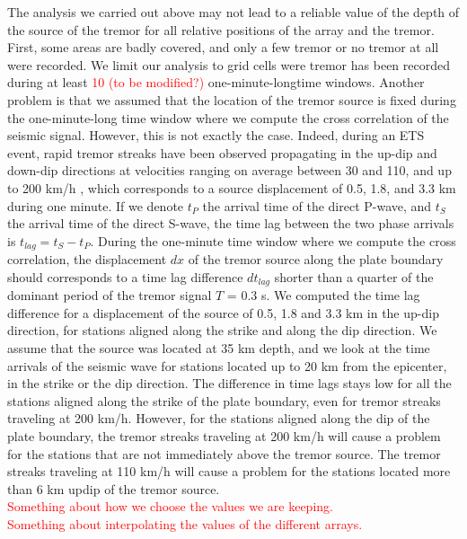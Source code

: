 \documentclass[letterpaper, 12pt]{article}
\begin{document}
The analysis we carried out above may not lead to a reliable value of the depth of the source of the tremor for all relative positions of the array and the tremor. First, some areas are badly covered, and only a few tremor or no tremor at all were recorded. We limit our analysis to grid cells were tremor has been recorded during at least \textcolor{red}{10 (to be modified?)} one-minute-longtime windows. Another problem is that we assumed that the location of the tremor source is fixed during the one-minute-long time window where we compute the cross correlation of the seismic signal. However, this is not exactly the case. Indeed, during an ETS event, rapid tremor streaks have been observed propagating in the up-dip and down-dip directions at velocities ranging on average between 30 and 110, and up to 200 km/h \cite{GHO_2010_G3}, which corresponds to a source displacement of 0.5, 1.8, and 3.3 km during one minute. If we denote $t_P$ the arrival time of the direct P-wave, and $t_S$ the arrival time of the direct S-wave, the time lag between the two phase arrivals is $t_{lag} = t_S - t_P$. During the one-minute time window where we compute the cross correlation, the displacement $dx$ of the tremor source along the plate boundary should corresponds to a time lag difference $dt_{lag}$ shorter than a quarter of the dominant period of the tremor signal $T$ = 0.3 s. We computed the time lag difference for a displacement of the source of 0.5, 1.8 and 3.3 km in the up-dip direction, for stations aligned along the strike and along the dip direction. We assume that the source was located at 35 km depth, and we look at the time arrivals of the seismic wave for stations located up to 20 km from the epicenter, in the strike or the dip direction. The difference in time lags stays low for all the stations aligned along the strike of the plate boundary, even for tremor streaks traveling at 200 km/h. However, for the stations aligned along the dip of the plate boundary, the tremor streaks traveling at 200 km/h will cause a problem for the stations that are not immediately above the tremor source. The tremor streaks traveling at 110 km/h will cause a problem for the stations located more than 6 km updip of the tremor source. \\

\textcolor{red}{Something about how we choose the values we are keeping.} \\

\textcolor{red}{Something about interpolating the values of the different arrays.} \\
\end{document}

